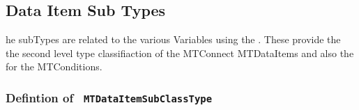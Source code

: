 \FloatBarrier
\subsection{Data Item Sub Types} \label{model:DataItemSubTypes}

he \glspl{subType} are related to the various \glspl{Variable} using the . 
These provide the the second level type classifiaction of the MTConnect \glspl{MTDataItem} and 
also the  for the \glspl{MTCondition}.

\subsubsection{Defintion of \texttt{ MTDataItemSubClassType}}
  \label{type:MTDataItemSubClassType}

